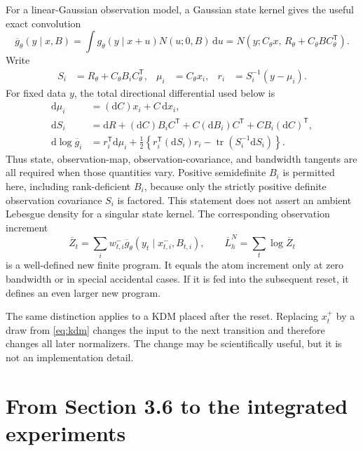 \documentclass[11pt]{article}
\newcommand{\dd}{\mathrm{d}}
\begin{document}
For a linear-Gaussian observation model, a Gaussian state kernel gives the
useful exact convolution
\begin{equation}
 \overline g_\theta(y\mid x,B)
 = \int g_\theta(y\mid x+u)N(u;0,B)\,\dd u
 = N\!\left(y;C_\theta x,\,
       R_\theta+C_\theta B C_\theta^\mathsf{T}\right).
 \label{eq:linear-convolution}
\end{equation}
Write
\begin{align}
 S_i &= R_\theta+C_\theta B_i C_\theta^\mathsf{T}, &
 \mu_i &= C_\theta x_i, &
 r_i &= S_i^{-1}(y-\mu_i).
\end{align}
For fixed data $y$, the total directional differential used below is
\begin{align}
 \dd\mu_i
   &= (\dd C)x_i+C\,\dd x_i,\\
 \dd S_i
   &= \dd R+(\dd C)B_iC^\mathsf{T}
      +C(\dd B_i)C^\mathsf{T}+CB_i(\dd C)^\mathsf{T},\\
 \dd\log \overline g_i
   &=r_i^\mathsf{T}\dd\mu_i
     +\frac12\left\{
       r_i^\mathsf{T}(\dd S_i)r_i
       -\operatorname{tr}(S_i^{-1}\dd S_i)
     \right\}.
 \label{eq:linear-convolution-tangent}
\end{align}
Thus state, observation-map, observation-covariance, and bandwidth tangents
are all required when those quantities vary.  Positive semidefinite $B_i$ is
permitted here, including rank-deficient $B_i$, because only the strictly
positive definite observation covariance $S_i$ is factored.  This statement
does not assert an ambient Lebesgue density for a singular state kernel.
The corresponding observation increment
\begin{equation}
 \overline Z_t
 =\sum_i w_{t,i}^{-}\overline g_\theta(y_t\mid x_{t,i}^{-},B_{t,i}),
 \qquad
 \overline L_h^N=\sum_t\log\overline Z_t
 \label{eq:smoothed-value}
\end{equation}
is a well-defined new finite program.  It equals the atom increment only at
zero bandwidth or in special accidental cases.  If it is fed into the
subsequent reset, it defines an even larger new program.

The same distinction applies to a KDM placed after the reset.  Replacing
$x_t^+$ by a draw from \eqref{eq:kdm} changes the input to the next
transition and therefore changes all later normalizers.  The change may be
scientifically useful, but it is not an implementation detail.

\section{From Section 3.6 to the integrated experiments}
\label{sec:history}
\end{document}
